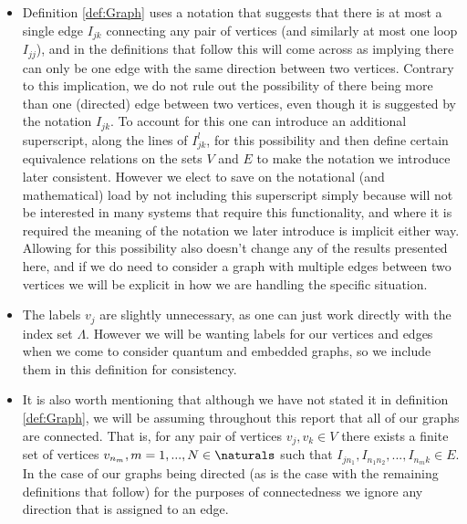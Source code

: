 \begin{itemize}
	\item Definition \ref{def:Graph} uses a notation that suggests that there is at most a single edge $I_{jk}$ connecting any pair of vertices (and similarly at most one loop $I_{jj}$), and in the definitions that follow this will come across as implying there can only be one edge with the same direction between two vertices.
	Contrary to this implication, we do not rule out the possibility of there being more than one (directed) edge between two vertices, even though it is suggested by the notation $I_{jk}$.
	To account for this one can introduce an additional superscript, along the lines of $I_{jk}^{l}$, for this possibility and then define certain equivalence relations on the sets $V$ and $E$ to make the notation we introduce later consistent.
	However we elect to save on the notational (and mathematical) load by not including this superscript simply because will not be interested in many systems that require this functionality, and where it is required the meaning of the notation we later introduce is implicit either way.
	Allowing for this possibility also doesn't change any of the results presented here, and if we do need to consider a graph with multiple edges between two vertices we will be explicit in how we are handling the specific situation.
	\item The labels $v_j$ are slightly unnecessary, as one can just work directly with the index set $\Lambda$.
	However we will be wanting labels for our vertices and edges when we come to consider quantum and embedded graphs, so we include them in this definition for consistency.
	\item It is also worth mentioning that although we have not stated it in definition \ref{def:Graph}, we will be assuming throughout this report that all of our graphs are connected.
	That is, for any pair of vertices $v_j, v_k\in V$ there exists a finite set of vertices $v_{n_m}, m=1,...,N\in\naturals$ such that $I_{jn_1}, I_{n_1 n_2}, ... , I_{n_m k}\in E$.
	In the case of our graphs being directed (as is the case with the remaining definitions that follow) for the purposes of connectedness we ignore any direction that is assigned to an edge. 
\end{itemize}


